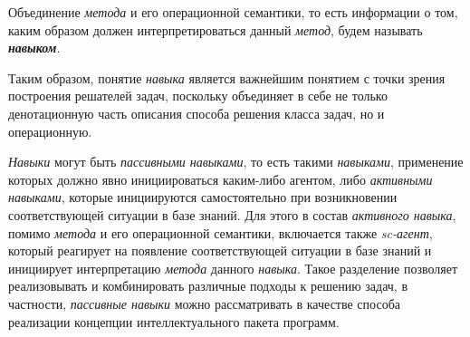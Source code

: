 Объединение \textit{метода} и его операционной семантики, то есть информации о том, каким образом должен интерпретироваться данный \textit{метод}, будем называть \textbf{\textit{навыком}}.

\begin{SCn}

	\begin{scnsubdividing}
		\begin{scnindent}
		\end{scnindent}
	\end{scnsubdividing}
\end{SCn}

Таким образом, понятие \textit{навыка} является важнейшим понятием с точки зрения построения решателей задач, поскольку объединяет в себе не только денотационную часть описания способа решения класса задач, но и операционную.

\textit{Навыки} могут быть \textit{пассивными навыками}, то есть такими \textit{навыками}, применение которых должно явно инициироваться каким-либо агентом, либо \textit{активными навыками}, которые инициируются самостоятельно при возникновении соответствующей ситуации в базе знаний. Для этого в состав \textit{активного навыка}, помимо \textit{метода} и его операционной семантики, включается также \textit{sc-агент}, который реагирует на появление соответствующей ситуации в базе знаний и инициирует интерпретацию \textit{метода} данного \textit{навыка}.
Такое разделение позволяет реализовывать и комбинировать различные подходы к решению задач, в частности, \textit{пассивные навыки} можно рассматривать в качестве способа реализации концепции интеллектуального пакета программ.

